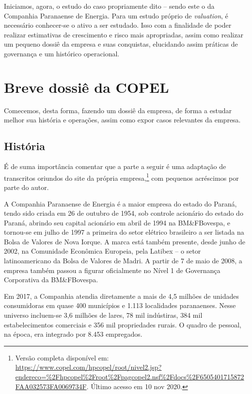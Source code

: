 \documentclass[grad,numbers]{coppe}
\begin{document}
  Iniciamos, agora, o estudo do caso propriamente dito -- sendo este o da Companhia Paranaense de Energia. Para um estudo próprio de \emph{valuation}, é necessário conhecer-se o ativo a ser estudado. Isso com a finalidade de poder realizar estimativas de crescimento e risco mais apropriadas, assim como realizar um pequeno dossiê da empresa e suas conquistas, elucidando assim práticas de governança e um histórico operacional.

  \hypertarget{breve-dossiuxea-da-copel}{%
  \section{Breve dossiê da COPEL}\label{breve-dossiuxea-da-copel}}

  Comecemos, desta forma, fazendo um dossiê da empresa, de forma a estudar melhor sua história e operações, assim como expor casos relevantes da empresa.

  \hypertarget{histuxf3ria}{%
  \subsection{História}\label{histuxf3ria}}

  É de suma importância comentar que a parte a seguir é uma adaptação de transcritos oriundos do site da própria empresa,\footnote{Versão completa disponível em: \url{https://www.copel.com/hpcopel/root/nivel2.jsp?endereco=\%2Fhpcopel\%2Froot\%2Fpagcopel2.nsf\%2Fdocs\%2F6505401715872FAA032573FA0069734F}. Último acesso em 10 nov 2020.} com pequenos acréscimos por parte do autor.

  A Companhia Paranaense de Energia é a maior empresa do estado do Paraná, tendo sido criada em 26 de outubro de 1954, sob controle acionário do estado do Paraná, abrindo seu capital acionário em abril de 1994 na BM\&FBovespa, e tornou-se em julho de 1997 a primeira do setor elétrico brasileiro a ser listada na Bolsa de Valores de Nova Iorque. A marca está também presente, desde junho de 2002, na Comunidade Econômica Europeia, pela Latibex -- o setor latinoamericano da Bolsa de Valores de Madri. A partir de 7 de maio de 2008, a empresa também passou a figurar oficialmente no Nível 1 de Governança Corporativa da BM\&FBovespa.

  Em 2017, a Companhia atendia diretamente a mais de 4,5 milhões de unidades consumidoras em quase 400 municípios e 1.113 localidades paranaenses. Nesse universo incluem-se 3,6 milhões de lares, 78 mil indústiras, 384 mil estabelecimentos comerciais e 356 mil propriedades rurais. O quadro de pessoal, na época, era integrado por 8.453 empregados.
\end{document}
